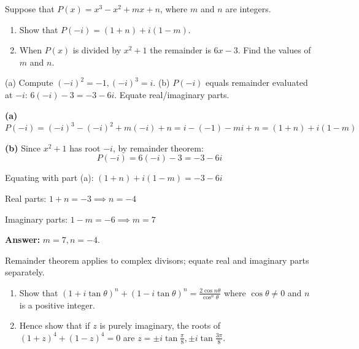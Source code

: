 
\begin{problem}
Suppose that $P(x) = x^3 - x^2 + mx + n$, where $m$ and $n$ are integers.
\begin{enumerate}
    \item Show that $P(-i) = (1+n) + i(1-m)$.
    \item When $P(x)$ is divided by $x^2 + 1$ the remainder is $6x - 3$. Find the values of $m$ and $n$.
\end{enumerate}
\end{problem}

\vspace{0.5cm}
\begin{hintbox}
(a) Compute $(-i)^2=-1, (-i)^3=i$. (b) $P(-i)$ equals remainder evaluated at $-i$: $6(-i)-3 = -3-6i$. Equate real/imaginary parts.
\end{hintbox}

\begin{solution}
\textbf{(a)} $P(-i) = (-i)^3 - (-i)^2 + m(-i) + n = i - (-1) - mi + n = (1+n) + i(1-m)$

\textbf{(b)} Since $x^2+1$ has root $-i$, by remainder theorem:
$$
P(-i) = 6(-i) - 3 = -3 - 6i
$$

Equating with part (a): $(1+n) + i(1-m) = -3 - 6i$

Real parts: $1+n = -3 \implies n = -4$

Imaginary parts: $1-m = -6 \implies m = 7$

\textbf{Answer:} $m = 7, n = -4$.
\end{solution}

\begin{takeaways}
Remainder theorem applies to complex divisors; equate real and imaginary parts separately.
\end{takeaways}

\vspace{1cm}

\begin{problem}
\begin{enumerate}
    \item Show that $(1 + i \tan \theta)^n + (1 - i \tan \theta)^n = \frac{2 \cos n\theta}{\cos^n \theta}$ where $\cos \theta \neq 0$ and $n$ is a positive integer.
    \item Hence show that if $z$ is purely imaginary, the roots of $(1 + z)^4 + (1 - z)^4 = 0$ are $z = \pm i \tan \frac{\pi}{8}, \pm i \tan \frac{3\pi}{8}$.
\end{enumerate}
\end{problem}

